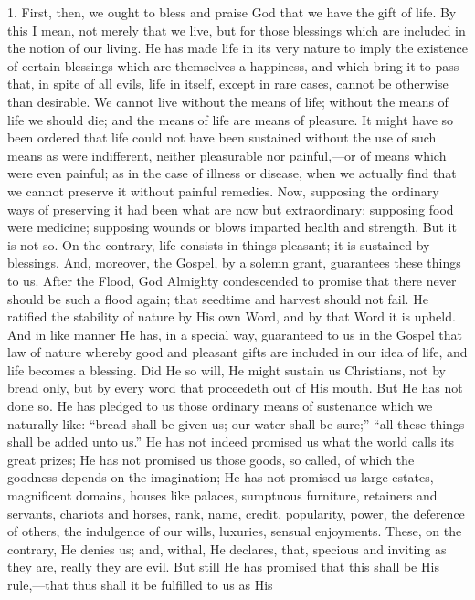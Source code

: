 1. First, then, we ought to bless and praise God that we have the
gift of life. By this I mean, not merely that we live, but for those
blessings which are included in the notion of our living. He has made
life in its very nature to imply the existence of certain blessings
which are themselves a happiness, and which bring it to pass that, in
spite of all evils, life in itself, except in rare cases, cannot be
otherwise than desirable. We cannot live without the means of life;
without the means of life we should die; and the means of life are
means of pleasure. It might have so been ordered that life could not
have been sustained without the use of such means as were indifferent,
neither pleasurable nor painful,—or of means which were even
painful; as in the case of illness or disease, when we actually find
that we cannot preserve it without painful remedies. Now, supposing
the ordinary ways of preserving it had been what are now but
extraordinary: supposing food were medicine; supposing wounds or blows
imparted health and strength. But it is not so. On the contrary, life
consists in things pleasant; it is sustained by blessings. And,
moreover, the Gospel, by a solemn grant, guarantees these things to
us. After the Flood, God Almighty condescended to promise that there
never should be such a flood again; that seedtime and harvest should
not fail. He ratified the stability of nature by His own Word, and by
that Word it is upheld. And in like manner He has, in a special way,
guaranteed to us in the Gospel that law of nature whereby good and
pleasant gifts are included in our idea of life, and life becomes a
blessing. Did He so will, He might sustain us Christians, not by bread
only, but by every word that proceedeth out of His mouth. But He has
not done so. He has pledged to us those ordinary means of sustenance
which we naturally like: ``bread shall be given us; our water
shall be sure;'' ``all these things shall be added unto
us.'' He has not indeed promised us what the world calls its great
prizes; He has not promised us those goods, so called, of which the
goodness depends on the imagination; He has not promised us large
estates, magnificent domains, houses like palaces, sumptuous
furniture, retainers and servants, chariots and horses, rank, name,
credit, popularity, power, the deference of others, the indulgence of
our wills, luxuries, sensual enjoyments. These, on the contrary, He
denies us; and, withal, He declares, that, specious and inviting as
they are, really they are evil. But still He has promised that this
shall be His rule,—that thus shall it be fulfilled to us as His
